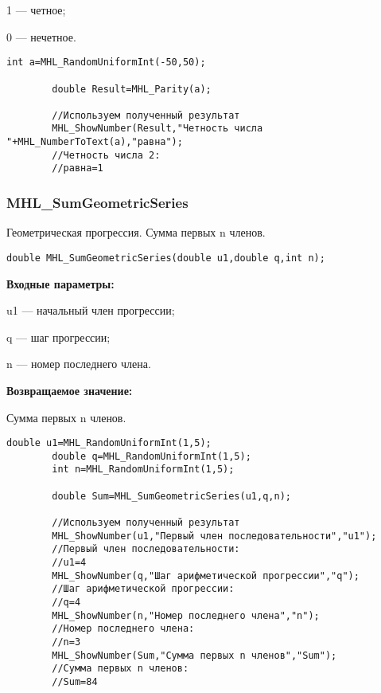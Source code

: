 \documentclass[a4paper,12pt]{article}
\begin{document}
 1 --- четное;
 
 0 --- нечетное.


\begin{lstlisting}[label=code_use_MHL_Parity,caption=Пример использования]
        int a=MHL_RandomUniformInt(-50,50);

        double Result=MHL_Parity(a);

        //Используем полученный результат
        MHL_ShowNumber(Result,"Четность числа "+MHL_NumberToText(a),"равна");
        //Четность числа 2:
        //равна=1
\end{lstlisting}

\subsubsection{MHL\_SumGeometricSeries}\label{MHL_SumGeometricSeries}

Геометрическая прогрессия. Сумма первых n членов.


\begin{lstlisting}[label=code_syntax_MHL_SumGeometricSeries,caption=Синтаксис]
double MHL_SumGeometricSeries(double u1,double q,int n);
\end{lstlisting}

\textbf{Входные параметры:}  
 
u1 --- начальный член прогрессии;
 
q --- шаг  прогрессии;
 
n --- номер последнего члена.

\textbf{Возвращаемое значение:}
 
Сумма первых n членов.


\begin{lstlisting}[label=code_use_MHL_SumGeometricSeries,caption=Пример использования]
        double u1=MHL_RandomUniformInt(1,5);
        double q=MHL_RandomUniformInt(1,5);
        int n=MHL_RandomUniformInt(1,5);

        double Sum=MHL_SumGeometricSeries(u1,q,n);

        //Используем полученный результат
        MHL_ShowNumber(u1,"Первый член последовательности","u1");
        //Первый член последовательности:
        //u1=4
        MHL_ShowNumber(q,"Шаг арифметической прогрессии","q");
        //Шаг арифметической прогрессии:
        //q=4
        MHL_ShowNumber(n,"Номер последнего члена","n");
        //Номер последнего члена:
        //n=3
        MHL_ShowNumber(Sum,"Сумма первых n членов","Sum");
        //Сумма первых n членов:
        //Sum=84
\end{lstlisting}
\end{document}
